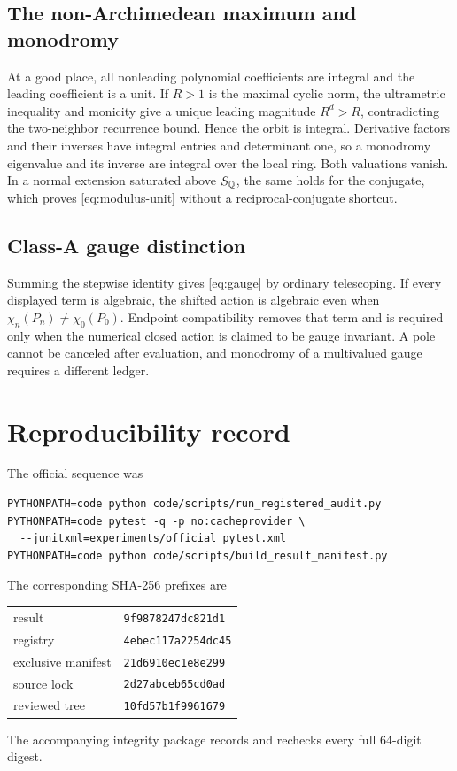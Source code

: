 \documentclass[11pt]{article}
\theoremstyle{definition}
\theoremstyle{remark}
\begin{document}
\subsection{The non-Archimedean maximum and monodromy}

At a good place, all nonleading polynomial coefficients are integral and the
leading coefficient is a unit.  If $R>1$ is the maximal cyclic norm, the
ultrametric inequality and monicity give a unique leading magnitude
$R^{d}>R$, contradicting the two-neighbor recurrence bound.  Hence the orbit
is integral.  Derivative factors and their inverses have integral entries and
determinant one, so a monodromy eigenvalue and its inverse are integral over
the local ring.  Both valuations vanish.  In a normal extension saturated
above $S_{\mathbb Q}$, the same holds for the conjugate, which proves
\eqref{eq:modulus-unit} without a reciprocal-conjugate shortcut.

\subsection{Class-A gauge distinction}

Summing the stepwise identity gives \eqref{eq:gauge} by ordinary
telescoping.  If every displayed term is algebraic, the shifted action is
algebraic even when $\chi_n(P_n)\neq\chi_0(P_0)$.  Endpoint compatibility
removes that term and is required only when the numerical closed action is
claimed to be gauge invariant.  A pole cannot be canceled after evaluation,
and monodromy of a multivalued gauge requires a different ledger.

\section{Reproducibility record}
\label{app:repro}

The official sequence was
\begin{verbatim}
PYTHONPATH=code python code/scripts/run_registered_audit.py
PYTHONPATH=code pytest -q -p no:cacheprovider \
  --junitxml=experiments/official_pytest.xml
PYTHONPATH=code python code/scripts/build_result_manifest.py
\end{verbatim}
The corresponding SHA-256 prefixes are
\begin{center}
\small
\begin{tabular}{@{}ll@{}}
result & \texttt{9f9878247dc821d1} \\
registry & \texttt{4ebec117a2254dc45} \\
exclusive manifest & \texttt{21d6910ec1e8e299} \\
source lock & \texttt{2d27abceb65cd0ad} \\
reviewed tree & \texttt{10fd57b1f9961679} \\
\end{tabular}
\end{center}
The accompanying integrity package records and rechecks every full 64-digit
digest.
\end{document}
